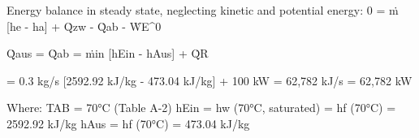 Energy balance in steady state, neglecting kinetic and potential energy:  
0 = ṁ [he - ha] + Q̇zw - Q̇ab - ẆE^0  

Q̇aus = Q̇ab = ṁin [hEin - hAus] + Q̇R  

= 0.3 kg/s [2592.92 kJ/kg - 473.04 kJ/kg] + 100 kW  
= 62,782 kJ/s = 62,782 kW  

Where:  
TAB = 70°C (Table A-2)  
hEin = hw (70°C, saturated) = hf (70°C) = 2592.92 kJ/kg  
hAus = hf (70°C) = 473.04 kJ/kg